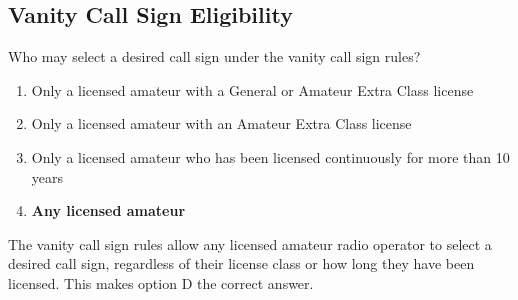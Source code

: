 \subsection{Vanity Call Sign Eligibility}
\label{T1C02}

\begin{tcolorbox}[colback=gray!10!white,colframe=black!75!black,title=T1C02]
Who may select a desired call sign under the vanity call sign rules?
\begin{enumerate}[label=\Alph*),noitemsep]
    \item Only a licensed amateur with a General or Amateur Extra Class license
    \item Only a licensed amateur with an Amateur Extra Class license
    \item Only a licensed amateur who has been licensed continuously for more than 10 years
    \item \textbf{Any licensed amateur}
\end{enumerate}
\end{tcolorbox}

The vanity call sign rules allow any licensed amateur radio operator to select a desired call sign, regardless of their license class or how long they have been licensed. This makes option D the correct answer.